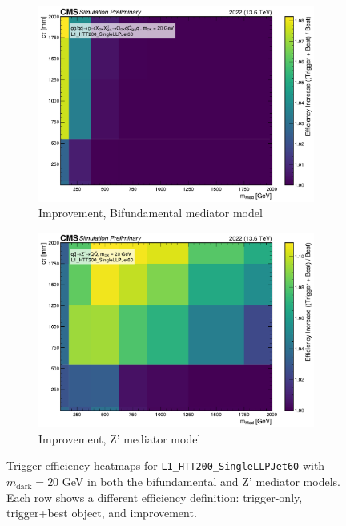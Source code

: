\begin{figure}[h]
  \vspace{1em}

  \begin{subfigure}[t]{0.45\textwidth}
    \centering
    \includegraphics[width=\linewidth]{images/L1/llp_2D_tchan/trigeffplots2D_L1_efftype-improv_t-channel_mDark-20_L1_HTT200_SingleLLPJet60_study_cloppear.pdf}
    \caption{Improvement, Bifundamental mediator model}
    \label{fig:htt200singlellpjet60_improv_tchan}
  \end{subfigure}
  \hfill
  \begin{subfigure}[t]{0.45\textwidth}
    \centering
    \includegraphics[width=\linewidth]{images/L1/llp_2D_schan/trigeffplots2D_L1_efftype-improv_s-channel_mDark-20_L1_HTT200_SingleLLPJet60_study_cloppear.pdf}
    \caption{Improvement, Z' mediator model}
    \label{fig:htt200singlellpjet60_improv_schan}
  \end{subfigure}

  \caption{Trigger efficiency heatmaps for \texttt{L1\_HTT200\_SingleLLPJet60} with $m_\mathrm{dark} = 20$ GeV in both the bifundamental and Z' mediator models. Each row shows a different efficiency definition: trigger-only, trigger+best object, and improvement.}
  \label{fig:htt200singlellpjet60_eff}
\end{figure}


